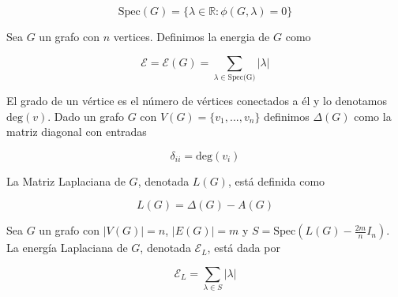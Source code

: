 \documentclass{article}
\begin{document}
$$\text{Spec}(G) = \lbrace \lambda \in \mathbb{R} : \phi(G, \lambda) = 0 \rbrace$$

Sea $G$ un grafo con $n$ vertices. Definimos la energia de $G$ como

$$\mathcal{E} = \mathcal{E}(G) = \sum_{\lambda \in \text{Spec(G)}} |\lambda|$$

El grado de un vértice es el número de vértices conectados a él y lo denotamos $\text{deg}(v)$. Dado un grafo $G$ con $V(G) = \lbrace v_1, ... , v_n \rbrace$ definimos $\Delta(G)$ como la matriz diagonal con entradas

$$\delta_{ii} = \text{deg}(v_i)$$

La Matriz Laplaciana de $G$, denotada $L(G)$, está definida como

$$L(G) = \Delta(G) - A(G)$$

Sea $G$ un grafo con $|V(G)| = n$, $|E(G)| = m$ y $S = \text{Spec}(L(G) - \frac{2m}{n}I_n)$. La energía Laplaciana de $G$, denotada $\mathcal{E}_L$, está dada por

$$\mathcal{E}_L = \sum_{\lambda \in S} |\lambda|$$
\end{document}
